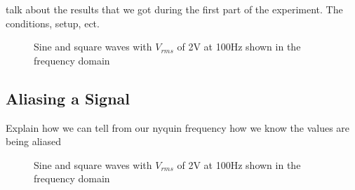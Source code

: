 \documentclass[letterpaper,12pt]{article}
\begin{document}
talk about the results that we got during the first part of the experiment. The conditions, setup, ect.
\begin{figure}[hbt!]
\centering
{}
\quad
{}
\caption{Sine and square waves with $V_{rms}$ of 2V at 100Hz shown in the frequency domain}
\end{figure}

\subsection{Aliasing a Signal}
Explain how we can tell from our nyquin frequency how we know the values are being aliased

\begin{figure}[h!]
\centering
{}
\quad
{}
\caption{Sine and square waves with $V_{rms}$ of 2V at 100Hz shown in the frequency domain}
\end{figure}
\end{document}
